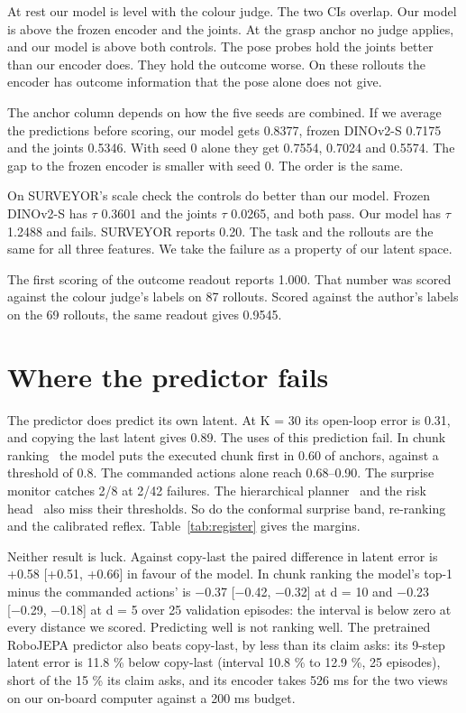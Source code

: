 \documentclass[10pt,twocolumn]{article}
\begin{document}
\begin{shissofinding}[Finding.]
At rest our model is level with the colour judge. The two CIs overlap. Our model is above the frozen encoder and the joints. At the grasp anchor no judge applies, and our model is above both controls. The pose probes hold the joints better than our encoder does. They hold the outcome worse. On these rollouts the encoder has outcome information that the pose alone does not give.
\end{shissofinding}


The anchor column depends on how the five seeds are combined. If we average the predictions before scoring, our model gets 0.8377, frozen DINOv2-S 0.7175 and the joints 0.5346. With seed 0 alone they get 0.7554, 0.7024 and 0.5574. The gap to the frozen encoder is smaller with seed 0. The order is the same.


On SURVEYOR's scale check the controls do better than our model. Frozen DINOv2-S has $\tau$ 0.3601 and the joints $\tau$ 0.0265, and both pass. Our model has $\tau$ 1.2488 and fails. SURVEYOR reports 0.20. The task and the rollouts are the same for all three features. We take the failure as a property of our latent space.


The first scoring of the outcome readout reports 1.000. That number was scored against the colour judge's labels on 87 rollouts. Scored against the author's labels on the 69 rollouts, the same readout gives 0.9545.


\section{Where the predictor fails}


The predictor does predict its own latent. At K = 30 its open-loop error is 0.31, and copying the last latent gives 0.89. The uses of this prediction fail. In chunk ranking~\citep{maes2026lewm} the model puts the executed chunk first in 0.60 of anchors, against a threshold of 0.8. The commanded actions alone reach 0.68--0.90. The surprise monitor catches 2/8 at 2/42 failures. The hierarchical planner~\citep{zhang2026hwm} and the risk head~\citep{liu2026reap} also miss their thresholds. So do the conformal surprise band, re-ranking and the calibrated reflex. Table~\ref{tab:register} gives the margins.


Neither result is luck. Against copy-last the paired difference in latent error is +0.58 [+0.51, +0.66] in favour of the model. In chunk ranking the model's top-1 minus the commanded actions' is −0.37 [−0.42, −0.32] at d = 10 and −0.23 [−0.29, −0.18] at d = 5 over 25 validation episodes: the interval is below zero at every distance we scored. Predicting well is not ranking well. The pretrained RoboJEPA predictor also beats copy-last, by less than its claim asks: its 9-step latent error is 11.8 \% below copy-last (interval 10.8 \% to 12.9 \%, 25 episodes), short of the 15 \% its claim asks, and its encoder takes 526 ms for the two views on our on-board computer against a 200 ms budget.
\end{document}
